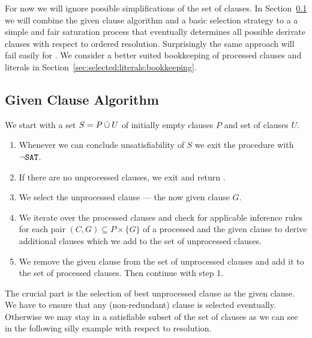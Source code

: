 For now we will ignore possible simplifications of the set of clauses.
In Section~\ref{sec:given:clause:algorithm}
we will combine the given clause algorithm
and a basic selection strategy to a a simple and fair saturation process
that eventually determines all possible derivate clauses
with respect to ordered resolution.
Surprisingly the same approach will fail easily for \InstGen{}.
We consider a better suited bookkeeping of processed clauses and literals
in Section~\ref{sec:selected:literals:bookkeeping}.




\subsection{Given Clause Algorithm}\label{sec:given:clause:algorithm}

\begin{procedure}
	We start with a set \( S = P \mathbin{\dot\cup} U \)
	of initially empty  clauses \( P \)
	and set of  clauses \( U \).
	\begin{enumerate}
		\item[\jek] Whenever we can conclude unsatisfiability of \( S \)
		we exit the procedure with \( \lnot\texttt{SAT} \).
		\setcounter{enumi}{0}
		\item If there are no unprocessed clauses,
		we exit and return \SAT{}.
		\item We select the  unprocessed clause --- the now given clause \( G  \). \hfill\jek{}
		\item We iterate over the processed clauses and check for applicable inference rules
		for each pair \( (C, G) \subseteq P \times \{ G \} \) of a processed and the given clause
		to derive additional clauses which we add to the set of unprocessed clauses. \hfill\jek{}
		\item We remove the given clause from the set of unprocessed clauses
		and add it to the set of processed clauses. Then continue with step 1.
	\end{enumerate}
\end{procedure}

The crucial part is the selection of best unprocessed clause as the given clause.
We have to ensure that any (non-redundant) clause is selected eventually.
Otherwise we may stay in a satisfiable subset of the set of clauses
as we can see in the following silly example with respect to resolution.

